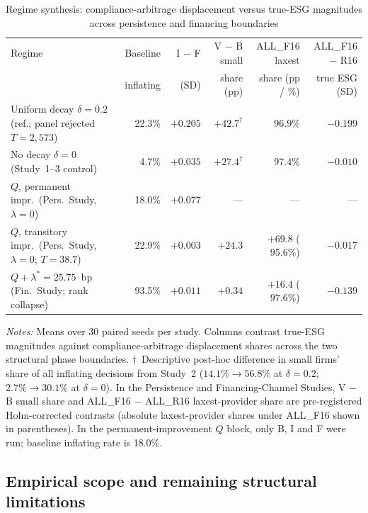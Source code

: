 \documentclass[11pt]{article}
\begin{document}
\begin{table}[t]
\centering
\small
\begin{threeparttable}
\caption{Regime synthesis: compliance-arbitrage displacement versus true-ESG magnitudes across persistence and financing boundaries}
\label{tab:regimes}
\setlength{\tabcolsep}{4pt}
\begin{tabular}{@{}p{4.5cm}rrrrr@{}}
\toprule
Regime & Baseline & I $-$ F & V $-$ B small & ALL\_F16 laxest & ALL\_F16 $-$ R16 \\
 & inflating & (SD) & share (pp) & share (pp / \%) & true ESG (SD) \\
\midrule
Uniform decay $\delta = 0.2$ (ref.; panel rejected $T=2{,}573$) & 22.3\% & $+0.205$ & $+42.7^\dagger$ & $96.9\%$ & $-0.199$ \\
No decay $\delta = 0$ (Study~1--3 control) & 4.7\% & $+0.035$ & $+27.4^\dagger$ & $97.4\%$ & $-0.010$ \\
$Q$, permanent impr.\ (Pers.\ Study, $\lambda = 0$) & 18.0\% & $+0.077$ & --- & --- & --- \\
$Q$, transitory impr.\ (Pers.\ Study, $\lambda = 0$; $T=38.7$) & 22.9\% & $+0.003$ & $+24.3$ & $+69.8$ ($95.6\%$) & $-0.017$ \\
$Q + \lambda^* = 25.75$~bp (Fin.\ Study; rank collapse) & 93.5\% & $+0.011$ & $+0.34$ & $+16.4$ ($97.6\%$) & $-0.139$ \\
\bottomrule
\end{tabular}
\begin{tablenotes}[flushleft]\footnotesize
\item \textit{Notes:} Means over 30 paired seeds per study. Columns contrast true-ESG magnitudes against compliance-arbitrage displacement shares across the two structural phase boundaries. $\dagger$~Descriptive post-hoc difference in small firms' share of all inflating decisions from Study~2 ($14.1\% \to 56.8\%$ at $\delta = 0.2$; $2.7\% \to 30.1\%$ at $\delta = 0$). In the Persistence and Financing-Channel Studies, V $-$ B small share and ALL\_F16 $-$ ALL\_R16 laxest-provider share are pre-registered Holm-corrected contrasts (absolute laxest-provider shares under ALL\_F16 shown in parentheses). In the permanent-improvement $Q$ block, only B, I and F were run; baseline inflating rate is 18.0\%.
\end{tablenotes}
\end{threeparttable}
\end{table}

\subsection{Empirical scope and remaining structural limitations}\label{sec:validity}
\end{document}
